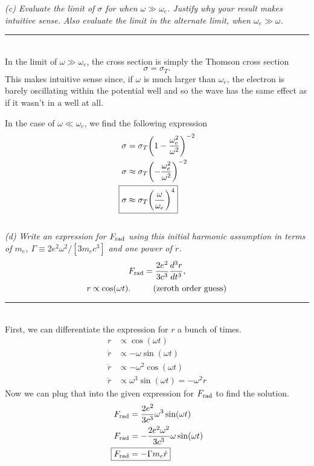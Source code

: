 \documentclass[12pt, letterpaper, twoside]{article}
\newcommand{\answer}[1]{
    \par\noindent\rule{\textwidth}{0.4pt}\\#1\\
}
\begin{document}
{\it \noindent (c) Evaluate the limit of $\sigma$ for when $\omega \gg \omega_{e}$. Justify why your result makes intuitive sense. Also evaluate the limit in the alternate limit, when $\omega_{e}\gg\omega$.}

\answer{
    In the limit of $\omega \gg \omega_e$, the cross section is simply the Thomson cross section 
    \begin{equation}
        \boxed{ \sigma = \sigma_T }.
    \end{equation}
    This makes intuitive sense since, if $\omega$ is much larger than $\omega_e$, the electron is barely oscillating within the potential well and so the wave has the same effect as if it wasn't in a well at all.
    
    In the case of $\omega \ll \omega_e$, we find the following expression
    \begin{align}
        \sigma &= \sigma_T \qty(1 - \frac{\omega_e^2}{\omega^2})^{-2} \\
        \sigma &\approx \sigma_T \qty(-\frac{\omega_e^2}{\omega^2})^{-2} \\
        \Aboxed{ \sigma &\approx \sigma_T \qty(\frac{\omega}{\omega_e})^4 }
    \end{align}
}


{\it \noindent
(d) Write an expression for $F_{\rm rad}$ using this {\it initial} harmonic assumption in terms of $m_e$, $\Gamma\equiv 2 e^2 \omega^2/[3 m_e c^3]$ and \emph{one power of} $\dot r$.
\begin{equation}
F_{\rm rad} = \frac{2e^2}{3 c^3} \frac{d^3 r}{dt^3},
\end{equation}
\begin{equation}
r \propto \cos (\omega t).  {\rm ~~~~~~~~(zeroth ~order~ guess)}
\end{equation}}

\answer{
    First, we can differentiate the expression for $r$ a bunch of times.
    \begin{align*}
        r &\propto \cos (\omega t) \\
        \dot{r} &\propto - \omega \sin (\omega t) \\
        \ddot{r} &\propto - \omega^2 \cos (\omega t) \\
        \dddot{r} &\propto \omega^3 \sin (\omega t) = - \omega^2 \dot{r}
    \end{align*}
    Now we can plug that into the given expression for $F_{\rm rad}$ to find the solution.
    \begin{align*}
        F_{\rm rad} &= \frac{2e^2}{3 c^3} \omega^3 \sin (\omega t) \\
        F_{\rm rad} &= - \frac{2e^2 \omega^2}{3 c^3} \omega \sin (\omega t) \\
        \Aboxed{ F_{\rm rad} &= - \Gamma m_e \dot{r} }
    \end{align*}
}
\end{document}
